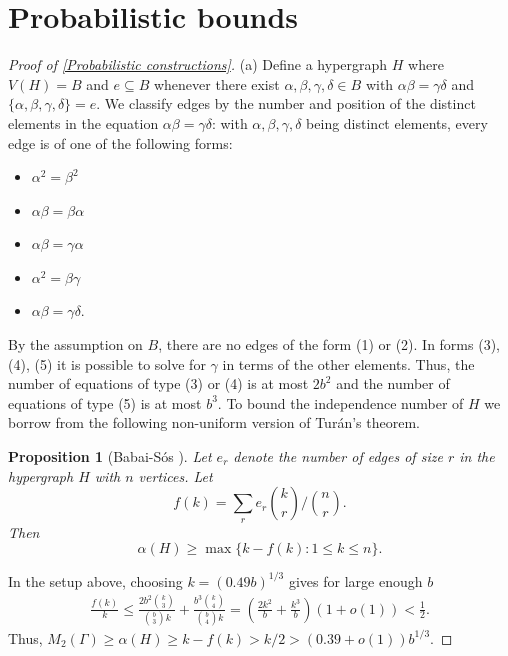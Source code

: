 \documentclass[12pt]{article}
\newtheorem{prop}{Proposition}
\begin{document}
\section{Probabilistic bounds} \label{probabilistic subsection}

\begin{proof}[Proof of \autoref{Probabilistic constructions}]

(a) Define a hypergraph $H$ where $V(H)=B$ and $e\subseteq B$ whenever there exist $\alpha,\beta,\gamma,\delta\in B$ with $\alpha\beta=\gamma\delta$ and $\{\alpha,\beta,\gamma,\delta\}=e$. We classify edges by the number and position of the distinct elements in the equation $\alpha\beta=\gamma\delta$: with $\alpha,\beta,\gamma,\delta$ being distinct elements, every edge is of one of the following forms:
\begin{itemize}
    \item[(1)] $\alpha^2=\beta^2$
    \item[(2)] $\alpha\beta=\beta\alpha$
    \item[(3)] $\alpha\beta=\gamma\alpha$
    \item[(4)] $\alpha^2=\beta\gamma$
    \item[(5)] $\alpha\beta=\gamma\delta$.
\end{itemize}
By the assumption on $B$, there are no edges of the form (1) or (2). In forms (3), (4), (5) it is possible to solve for $\gamma$ in terms of the other elements. Thus, the number of equations of type (3) or (4) is at most $2b^2$ and the number of equations of type (5) is at most $b^3$. To bound the independence number of $H$ we borrow from \cite{babai1985sidon} the following non-uniform version of Tur\'an's theorem.
\begin{prop}[Babai-S\'os \cite{babai1985sidon}] \label{Non-uniform Turans theorem}
Let $e_r$ denote the number of edges of size $r$ in the hypergraph $H$ with $n$ vertices. Let
$$f(k)=\sum_re_r{k\choose r}/{n\choose r}.$$
Then
$$\alpha(H)\ge\max\{k-f(k):1\le k\le n\}.$$
\end{prop}
In the setup above, choosing $k=(0.49b)^{1/3}$ gives for large enough $b$
$$\begin{aligned}
    \frac{f(k)}{k}\le\frac{2b^2{k\choose 3}}{{b\choose 3}k}+\frac{b^3{k\choose 4}}{{b\choose 4}k}
    =\left(\frac{2k^2}{b}+\frac{k^3}{b}\right)(1+o(1))<\frac{1}{2}.
\end{aligned}$$
Thus, $M_2(\Gamma)\ge\alpha(H)\ge k-f(k)>k/2>(0.39+o(1))b^{1/3}.$


\end{proof}
\end{document}
